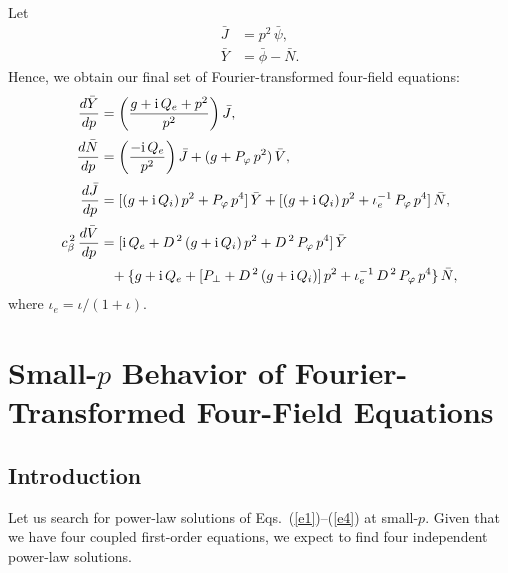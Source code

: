 \documentclass[12pt,prb,aps,notitlepage]{revtex4-1}
\begin{document}
Let
\begin{align}
\bar{J}&= p^2\,\bar{\psi},\\[0.5ex]
\bar{Y} &= \bar{\phi}-\bar{N}.
\end{align}
Hence, we obtain our final set of Fourier-transformed four-field equations:
\begin{align}\label{e1}
\frac{d\bar{Y}}{dp} &= \left(\frac{g+{\rm i}\,Q_e+p^2}{p^2}\right)\bar{J},\\[0.5ex]
\frac{d\bar{N}}{dp} &= \left(\frac{-{\rm i}\,Q_e}{p^2}\right)\bar{J} + (g + P_\varphi\,p^2)\,\bar{V},\\[0.5ex]
\frac{d\bar{J}}{dp} &= [(g+{\rm i}\,Q_i)\,p^2 + P_\varphi\,p^4]\,\bar{Y}
+ [(g+{\rm i}\,Q_i)\,p^2 + \iota_e^{-1}\,P_\varphi\,p^4]\,\bar{N},\\[0.5ex]
c_\beta^{\,2}\,\frac{d\bar{V}}{dp} &= [{\rm i}\,Q_e+ D^{\,2}\,(g+{\rm i}\,Q_i)\,p^2 + D^{\,2}\,P_\varphi\,p^4]\,\bar{Y}
\nonumber\\[0.5ex]&\phantom{=} +\{g+{\rm i}\,Q_e + [P_\perp+ D^{\,2}\,(g + {\rm i}\,Q_i)]\,p^2 + \iota_e^{-1}\,D^{\,2}\,P_\varphi\,p^4\}\,\bar{N},\label{e4}
\end{align}
where $\iota_e=\iota/(1+\iota)$. 

\section{Small-$p$ Behavior of Fourier-Transformed Four-Field Equations}
\subsection{Introduction}
Let us search for power-law solutions of Eqs.~(\ref{e1})--(\ref{e4}) at small-$p$. Given that we have four coupled first-order equations,
we expect to find four independent power-law solutions.
\end{document}
